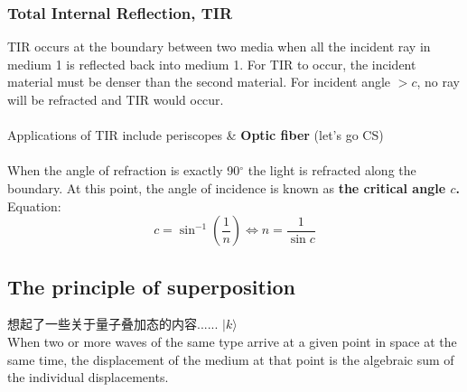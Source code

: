 \subsubsection*{Total Internal Reflection, TIR}
TIR occurs at the boundary between two media when all the incident ray in medium 1 is reflected back into medium 1. For TIR to occur, the incident material must be denser than the second material. For incident angle $>c$, no ray will be refracted and TIR would occur.\\\\
Applications of TIR include periscopes \&  \textbf{Optic fiber} (let's go CS)\\\\
When the angle of refraction is exactly 90$^\circ$ the light is refracted along the boundary. At this point, the angle of incidence is known as\textbf{ the critical angle \(c\).} Equation:
\[c=\sin^{-1}\left(\dfrac{1}{n}\right) \Leftrightarrow n=\dfrac{1}{\sin c}\]
\subsection{The principle of superposition}
想起了一些关于量子叠加态的内容...... $|k\rangle $\\
When two or more waves of the same type arrive at a given point in space at the same time, the displacement of the medium at that point is the algebraic sum of the individual displacements.
\begin{center}
\end{center}

